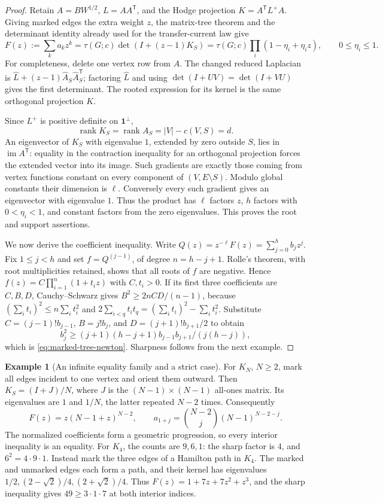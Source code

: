 \documentclass[11pt]{article}
\theoremstyle{definition}
\newtheorem{example}[theorem]{Example}
\theoremstyle{remark}
\begin{document}
\begin{proof}
Retain $A=BW^{1/2}$, $L=AA^{\mathsf T}$, and the Hodge projection
$K=A^{\mathsf T}L^+A$.  Giving marked edges the extra weight $z$, the
matrix-tree theorem and the determinant identity already used for the
transfer-current law give
\[
 F(z):=\sum_k a_kz^k
 =\tau(G;c)\det(I+(z-1)K_S)
 =\tau(G;c)\prod_i(1-\eta_i+\eta_i z),
 \qquad 0\le\eta_i\le1.
\]
For completeness, delete one vertex row from $A$.  The changed reduced
Laplacian is $\widehat L+(z-1)\widehat A_S\widehat A_S^{\mathsf T}$;
factoring $\widehat L$ and using $\det(I+UV)=\det(I+VU)$ gives the first
determinant.  The rooted expression for its kernel is the same orthogonal
projection $K$.

Since $L^+$ is positive definite on $\mathbf1^\perp$,
\[\operatorname{rank}K_S=\operatorname{rank}A_S=|V|-c(V,S)=d.\]
An eigenvector of $K_S$ with eigenvalue $1$, extended by zero outside $S$,
lies in $\operatorname{im}A^{\mathsf T}$: equality in the contraction
inequality for an orthogonal projection forces the extended vector into
its image.  Such gradients are exactly those coming from vertex functions
constant on every component of $(V,E\setminus S)$.  Modulo global constants
their dimension is $\ell$.  Conversely every such gradient gives an
eigenvector with eigenvalue $1$.  Thus the product has $\ell$ factors $z$,
$h$ factors with $0<\eta_i<1$, and constant factors from the zero
eigenvalues.  This proves the root and support assertions.

We now derive the coefficient inequality.  Write
$Q(z)=z^{-\ell}F(z)=\sum_{j=0}^h b_jz^j$.  Fix $1\le j<h$ and set
$f=Q^{(j-1)}$, of degree $n=h-j+1$.  Rolle's theorem, with root
multiplicities retained, shows that all roots of $f$ are negative.  Hence
$f(z)=C\prod_{i=1}^n(1+t_i z)$ with $C,t_i>0$.  If its first three
coefficients are $C,B,D$, Cauchy--Schwarz gives
$B^2\ge 2nCD/(n-1)$, because
$(\sum_i t_i)^2\le n\sum_i t_i^2$ and
$2\sum_{i<q}t_it_q=(\sum_i t_i)^2-\sum_i t_i^2$.
Substitute $C=(j-1)!b_{j-1}$, $B=j!b_j$, and
$D=(j+1)!b_{j+1}/2$ to obtain
\[b_j^2\ge (j+1)(h-j+1)b_{j-1}b_{j+1}/(j(h-j)),\]
which is
\eqref{eq:marked-tree-newton}.  Sharpness follows from the next example.
\end{proof}

\begin{example}[An infinite equality family and a strict case]
For $K_N$, $N\ge2$, mark all edges incident to one vertex and orient them
outward.  Then $K_S=(I+J)/N$, where $J$ is the $(N-1)\times(N-1)$
all-ones matrix.  Its eigenvalues are $1$ and $1/N$, the latter repeated
$N-2$ times.  Consequently
\[
 F(z)=z(N-1+z)^{N-2},\qquad
 a_{1+j}=\binom{N-2}{j}(N-1)^{N-2-j}.
\]
The normalized coefficients form a geometric progression, so every
interior inequality is an equality.  For $K_4$, the counts are $9,6,1$:
the sharp factor is $4$, and $6^2=4\cdot9\cdot1$.
Instead mark the three edges of a Hamilton path in $K_4$.  The marked and
unmarked edges each form a path, and their kernel has eigenvalues
$1/2,(2-\sqrt2)/4,(2+\sqrt2)/4$.  Thus
$F(z)=1+7z+7z^2+z^3$, and the sharp inequality gives
$49\ge3\cdot1\cdot7$ at both interior indices.
\end{example}
\end{document}
